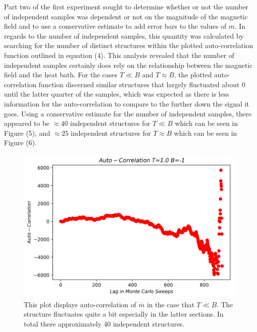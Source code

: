\documentclass[twocolumn]{article}
\begin{document}
Part two of the first experiment sought to determine whether or not the number of independent samples was dependent or not on the magnitude of the magnetic field and to use a conservative estimate to add error bars to the values of $\overline{m}$. In regards to the number of independent samples, this quantity was calculated by searching for the number of distinct structures within the plotted auto-correlation function outlined in equation (4). This analysis revealed that the number of independent samples certainly does rely on the relationship between the magnetic field and the heat bath. For the cases $T \ll B$ and $T \approx B$, the plotted auto-correlation function discerned similar structures that largely fluctuated about 0 until the latter quarter of the samples, which was expected as there is less information for the auto-correlation to compare to the further down the signal it goes. Using a conservative estimate for the number of independent samples, there appeared to be $\approx40$ independent structures for $T \ll B$ which can be seen in Figure (5), and $\approx 25$ independent structures for $T \approx B$ which can be seen in Figure (6).
\begin{figure}[H]
\caption{This plot displays auto-correlation of $\overline{m}$ in the case that $T \ll B$. The structure fluctuates quite a bit especially in the latter sections. In total there approximately 40 independent structures.}
\centering
\includegraphics[scale=.5]{AutocorrelationT=1B=minus1Scatter}
\end{figure}
\end{document}

